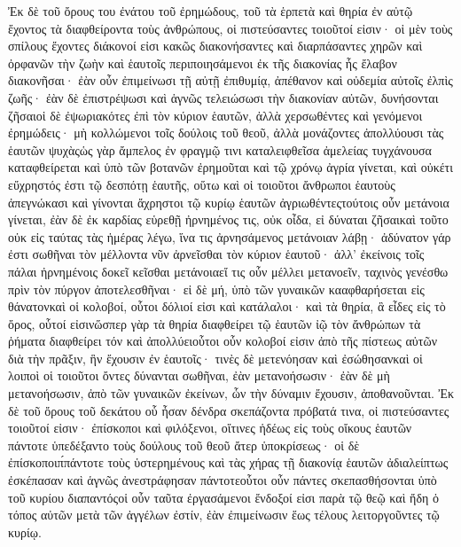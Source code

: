 Ἐκ δὲ τοῦ ὄρους του ἐνάτου τοῦ ἐρημώδους, τοῦ τὰ ἑρπετὰ καὶ θηρία ἐν αὐτῷ ἔχοντος τὰ διαφθείροντα τοὺς ἀνθρώπους, οἱ πιστεύσαντες τοιοῦτοί εἰσιν· οἱ μὲν τοὺς σπίλους ἔχοντες διάκονοί εἰσι κακῶς διακονήσαντες καὶ διαρπάσαντες χηρῶν καὶ ὀρφανῶν τὴν ζωὴν καὶ ἑαυτοῖς περιποιησάμενοι ἐκ τῆς διακονίας ἧς ἔλαβον διακονῆσαι· ἐὰν οὖν ἐπιμείνωσι τῇ αὐτῇ ἐπιθυμίᾳ, ἀπέθανον καὶ οὐδεμία αὐτοῖς ἐλπὶς ζωῆς· ἐὰν δὲ ἐπιστρέψωσι καὶ ἁγνῶς τελειώσωσι τὴν διακονίαν αὐτῶν, δυνήσονται ζῆσαιοἱ δὲ ἐψωριακότες ἐπὶ τὸν κύριον ἑαυτῶν, ἀλλὰ χερσωθέντες καὶ γενόμενοι ἐρημώδεις· μὴ κολλώμενοι τοῖς δούλοις τοῦ θεοῦ, ἀλλὰ μονάζοντες ἀπολλύουσι τὰς ἑαυτῶν ψυχὰςὡς γὰρ ἄμπελος ἐν φραγμῷ τινι καταλειφθεῖσα ἀμελείας τυγχάνουσα καταφθείρεται καὶ ὑπὸ τῶν βοτανῶν ἐρημοῦται καὶ τῷ χρόνῳ ἀγρία γίνεται, καὶ οὐκέτι εὔχρηστός ἐστι τῷ δεσπότῃ ἑαυτῆς, οὕτω καὶ οἱ τοιοῦτοι ἄνθρωποι ἑαυτοὺς ἀπεγνώκασι καὶ γίνονται ἄχρηστοι τῷ κυρίῳ ἑαυτῶν ἀγριωθέντεςτούτοις οὖν μετάνοια γίνεται, ἐὰν δὲ ἐκ καρδίας εὑρεθῇ ἠρνημένος τις, οὐκ οἶδα, εἰ δύναται ζῆσαικαὶ τοῦτο οὐκ εἰς ταύτας τὰς ἡμέρας λέγω, ἵνα τις ἀρνησάμενος μετάνοιαν λάβῃ· ἀδύνατον γάρ ἐστι σωθῆναι τὸν μέλλοντα νῦν ἀρνεῖσθαι τὸν κύριον ἑαυτοῦ· ἀλλ’ ἐκείνοις τοῖς πάλαι ἠρνημένοις δοκεῖ κεῖσθαι μετάνοιαεἴ τις οὖν μέλλει μετανοεῖν, ταχινὸς γενέσθω πρὶν τὸν πύργον ἀποτελεσθῆναι· εἰ δὲ μή, ὑπὸ τῶν γυναικῶν κααφθαρήσεται εἰς θάνατονκαὶ οἱ κολοβοί, οὗτοι δόλιοί εἰσι καὶ κατάλαλοι· καὶ τὰ θηρία, ἃ εἶδες εἰς τὸ ὄρος, οὗτοί εἰσινὥσπερ γὰρ τὰ θηρία διαφθείρει τῷ ἑαυτῶν ἰῷ τὸν ἄνθρώπων τὰ ῥήματα διαφθείρει τόν καὶ ἀπολλύειοὗτοι οὖν κολοβοί εἰσιν ἀπὸ τῆς πίστεως αὐτῶν διὰ τὴν πρᾶξιν, ἣν ἔχουσιν ἐν ἑαυτοῖς· τινὲς δὲ μετενόησαν καὶ ἐσώθησανκαὶ οἱ λοιποὶ οἱ τοιοῦτοι ὄντες δύνανται σωθῆναι, ἐὰν μετανοήσωσιν· ἐὰν δὲ μὴ μετανοήσωσιν, ἀπὸ τῶν γυναικῶν ἐκείνων, ὧν τὴν δύναμιν ἔχουσιν, ἀποθανοῦνται.
Ἐκ δὲ τοῦ ὄρους τοῦ δεκάτου οὗ ἦσαν δένδρα σκεπάζοντα πρόβατά τινα, οἱ πιστεύσαντες τοιοῦτοί εἰσιν· ἐπίσκοποι καὶ φιλόξενοι, οἵτινες ἡδέως εἰς τοὺς οἴκους ἑαυτῶν πάντοτε ὑπεδέξαντο τοὺς δούλους τοῦ θεοῦ ἄτερ ὑποκρίσεως· οἱ δὲ ἐπίσκοποιπ́πάντοτε τοὺς ὑστερημένους καὶ τὰς χήρας τῇ διακονίᾳ ἑαυτῶν ἀδιαλείπτως ἐσκέπασαν καὶ ἁγνῶς ἀνεστράφησαν πάντοτεοὗτοι οὖν πάντες σκεπασθήσονται ὑπὸ τοῦ κυρίου διαπαντόςοἱ οὖν ταῦτα ἐργασάμενοι ἔνδοξοί εἰσι παρὰ τῷ θεῷ καὶ ἤδη ὁ τόπος αὐτῶν μετὰ τῶν ἀγγέλων ἐστίν, ἐὰν ἐπιμείνωσιν ἕως τέλους λειτοργοῦντες τῷ κυρίῳ.
